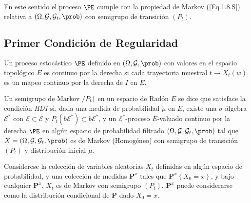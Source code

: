 En este sentido el proceso $\PE$ cumple con la propiedad de Markov (\ref{Eq.1.8.S}) relativa a $\left(\Omega,\mathcal{G},\mathcal{G}_{t},\prob\right)$ con semigrupo de transici\'on $\left(P_{t}\right)$.
\subsection{Primer Condici\'on de Regularidad}
\begin{Def}
Un proceso estoc\'astico $\PE$ definido en $\left(\Omega,\mathcal{G},\prob\right)$ con valores en el espacio topol\'ogico $E$ es continuo por la derecha si cada trayectoria muestral $t\rightarrow X_{t}\left(w\right)$ es un mapeo continuo por la derecha de $I$ en $E$.
\end{Def}

\begin{Def}[HD1]\label{Eq.2.1.S}
Un semigrupo de Markov $\left/P_{t}\right)$ en un espacio de Rad\'on $E$ se dice que satisface la condici\'on {\em HD1} si, dada una medida de probabilidad $\mu$ en $E$, existe una $\sigma$-\'algebra $\mathcal{E^{*}}$ con $\mathcal{E}\subset\mathcal{E}$ y $P_{t}\left(b\mathcal{E}^{*}\right)\subset b\mathcal{E}^{*}$, y un $\mathcal{E}^{*}$-proceso $E$-valuado continuo por la derecha $\PE$ en alg\'un espacio de probabilidad filtrado $\left(\Omega,\mathcal{G},\mathcal{G}_{t},\prob\right)$ tal que $X=\left(\Omega,\mathcal{G},\mathcal{G}_{t},\prob\right)$ es de Markov (Homog\'eneo) con semigrupo de transici\'on $(P_{t})$ y distribuci\'on inicial $\mu$.
\end{Def}

Considerese la colecci\'on de variables aleatorias $X_{t}$ definidas en alg\'un espacio de probabilidad, y una colecci\'on de medidas $\mathbf{P}^{x}$ tales que $\mathbf{P}^{x}\left\{X_{0}=x\right\}$, y bajo cualquier $\mathbf{P}^{x}$, $X_{t}$ es de Markov con semigrupo $\left(P_{t}\right)$. $\mathbf{P}^{x}$ puede considerarse como la distribuci\'on condicional de $\mathbf{P}$ dado $X_{0}=x$.

